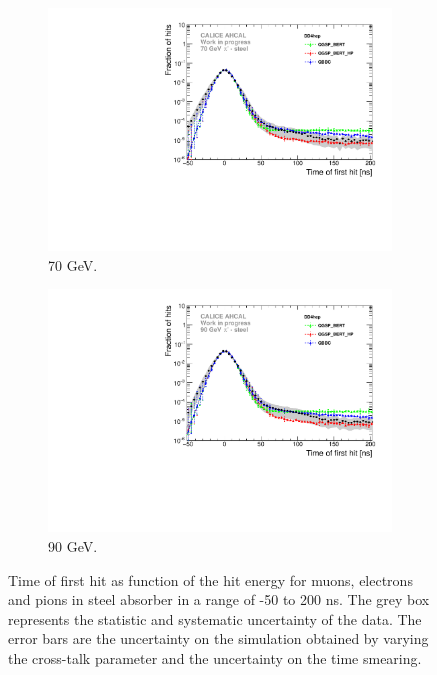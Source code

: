 \begin{figure}[htbp!]
\begin{subfigure}[t]{0.49\textwidth}
    \includegraphics[width=1\textwidth]{../Thesis_Plots/Timing/Pions/Plots/Comparison_SimData_Pion70GeV_LateClusters_DD4hep.pdf}
    \caption{70 GeV.} \label{fig:dNdt_SimData_70GeV_DD4hep}
  \end{subfigure}
  \hfill
  \begin{subfigure}[t]{0.49\textwidth}
    \centering
    \includegraphics[width=1\textwidth]{../Thesis_Plots/Timing/Pions/Plots/Comparison_SimData_Pion90GeV_LateClusters_DD4hep.pdf}
    \caption{90 GeV.} \label{fig:dNdt_SimData_90GeV_DD4hep}
  \end{subfigure}
  \caption{Time of first hit as function of the hit energy for muons, electrons and pions in steel absorber in a range of -50 to 200 ns. The grey box represents the statistic and systematic uncertainty of the data. The error bars are the uncertainty on the \ddhep simulation obtained by varying the cross-talk parameter and the uncertainty on the time smearing.}
\end{figure}


